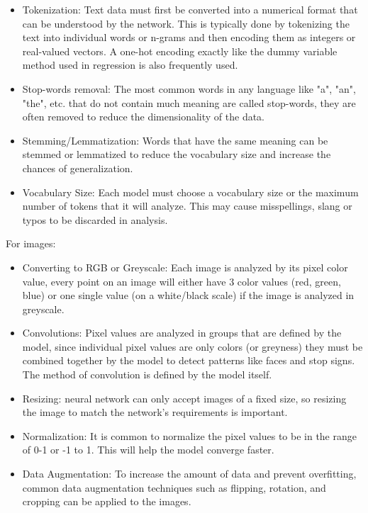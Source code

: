 \begin{itemize}
	\item Tokenization: Text data must first be converted into a numerical format that can be understood by the network. This is typically done by tokenizing the text into individual words or n-grams and then encoding them as integers or real-valued vectors. A one-hot encoding exactly like the dummy variable method used in regression is also frequently used.  
	\item Stop-words removal: The most common words in any language like "a", "an", "the", etc. that do not contain much meaning are called stop-words, they are often removed to reduce the dimensionality of the data.
	\item Stemming/Lemmatization: Words that have the same meaning can be stemmed or lemmatized to reduce the vocabulary size and increase the chances of generalization.
	\item Vocabulary Size: Each model must choose a vocabulary size or the maximum number of tokens that it will analyze. This may cause misspellings, slang or typos to be discarded in analysis.
\end{itemize}

For images:
    
\begin{itemize}
	\item Converting to RGB or Greyscale: Each image is analyzed by its pixel color value, every point on an image will either have 3 color values (red, green, blue) or one single value (on a white/black scale) if the image is analyzed in greyscale.
	\item Convolutions: Pixel values are analyzed in groups that are defined by the model, since individual pixel values are only colors (or greyness) they must be combined together by the model to detect patterns like faces and stop signs. The method of convolution is defined by the model itself.
	\item Resizing: neural network can only accept images of a fixed size, so resizing the image to match the network's requirements is important.
	\item Normalization: It is common to normalize the pixel values to be in the range of 0-1 or -1 to 1. This will help the model converge faster.
	\item Data Augmentation: To increase the amount of data and prevent overfitting, common data augmentation techniques such as flipping, rotation, and cropping can be applied to the images.
\end{itemize}

